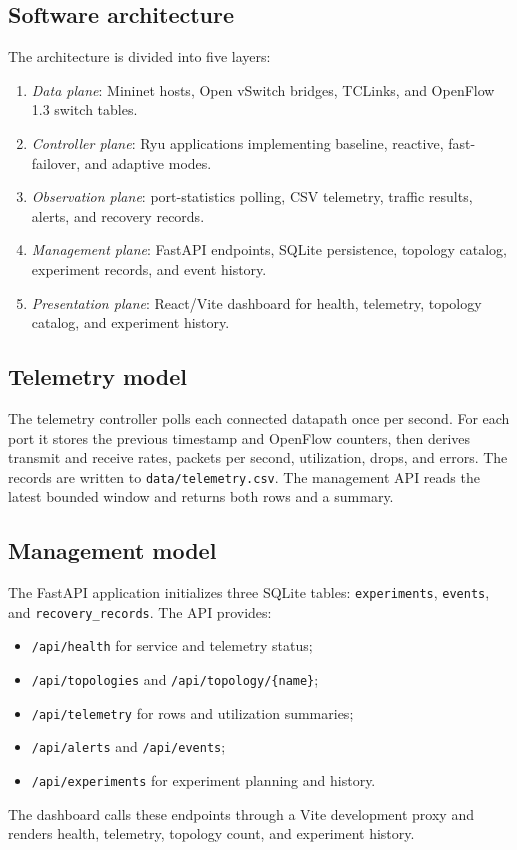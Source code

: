 \documentclass[conference]{IEEEtran}
\begin{document}
\subsection{Software architecture}

The architecture is divided into five layers:
\begin{enumerate}
\item \textit{Data plane}: Mininet hosts, Open vSwitch bridges, TCLinks, and
  OpenFlow 1.3 switch tables.
\item \textit{Controller plane}: Ryu applications implementing baseline,
  reactive, fast-failover, and adaptive modes.
\item \textit{Observation plane}: port-statistics polling, CSV telemetry,
  traffic results, alerts, and recovery records.
\item \textit{Management plane}: FastAPI endpoints, SQLite persistence,
  topology catalog, experiment records, and event history.
\item \textit{Presentation plane}: React/Vite dashboard for health, telemetry,
  topology catalog, and experiment history.
\end{enumerate}

\subsection{Telemetry model}

The telemetry controller polls each connected datapath once per second. For
each port it stores the previous timestamp and OpenFlow counters, then derives
transmit and receive rates, packets per second, utilization, drops, and
errors. The records are written to \texttt{data/telemetry.csv}. The management
API reads the latest bounded window and returns both rows and a summary.

\subsection{Management model}

The FastAPI application initializes three SQLite tables: \texttt{experiments},
\texttt{events}, and \texttt{recovery\_records}. The API provides:
\begin{itemize}
\item \texttt{/api/health} for service and telemetry status;
\item \texttt{/api/topologies} and \texttt{/api/topology/\{name\}};
\item \texttt{/api/telemetry} for rows and utilization summaries;
\item \texttt{/api/alerts} and \texttt{/api/events};
\item \texttt{/api/experiments} for experiment planning and history.
\end{itemize}
The dashboard calls these endpoints through a Vite development proxy and
renders health, telemetry, topology count, and experiment history.
\end{document}
